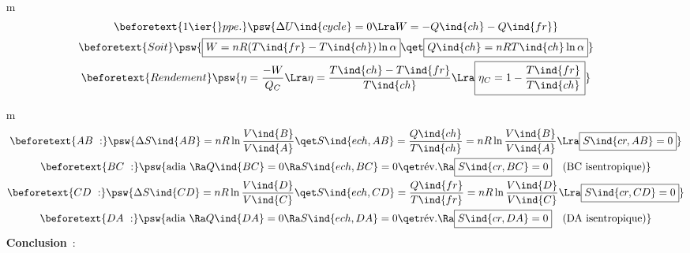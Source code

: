 \documentclass[../../main/main.tex]{subfiles}
\begin{document}
\begin{tcb*}[breakable]
\begin{enumerate}[label=\sqenumi]
\begin{gather*}
      \end{gather*}
    \item[m]
      \begin{gather*}
        \beforetext{1\ier{} ppe.}
        \psw{%
                  \Delta{U}\ind{cycle} = 0
                \Lra
                W = -Q\ind{ch} - Q\ind{fr}
        }%
        \\\beforetext{Soit}
        \psw{%
                  \boxed{W = nR(T\ind{fr} - T\ind{ch})\ln \alpha}
                \qet
                \boxed{Q\ind{ch} = nRT\ind{ch}\ln \alpha}
        }%
        \\\beforetext{Rendement}
        \psw{%
                  \eta = \frac{-W}{Q_C}
                \Lra
                \eta = \frac{T\ind{ch}-T\ind{fr}}{T\ind{ch}}
                \Lra
                \boxed{\eta_C = 1-\frac{T\ind{fr}}{T\ind{ch}}}
        }%
      \end{gather*}
    \item[m]
      \begin{gather*}
        \beforetext{AB~:}
        \psw{%
                  \Delta{S}\ind{AB} = nR \ln \frac{V\ind{B}}{V\ind{A}}
                \qet
                S\ind{ech,AB} = \frac{Q\ind{ch}}{T\ind{ch}} = nR \ln
                \frac{V\ind{B}}{V\ind{A}}
                \Lra
                \boxed{S\ind{cr,AB} = 0}
        }%
        \\\beforetext{BC~:}
        \psw{%
                  \text{adia~} \Ra Q\ind{BC} = 0
                \Ra 
                S\ind{ech,BC} = 0
                \qet
                \text{rév.} \Ra \boxed{S\ind{cr,BC} = 0}
                \quad \text{(BC isentropique)}
        }%
        \\\beforetext{CD~:}
        \psw{%
                  \Delta{S}\ind{CD} = nR \ln \frac{V\ind{D}}{V\ind{C}}
                \qet
                S\ind{ech,CD} = \frac{Q\ind{fr}}{T\ind{fr}} = nR \ln
                \frac{V\ind{D}}{V\ind{C}}
                \Lra
                \boxed{S\ind{cr,CD} = 0}
        }%
        \\\beforetext{DA~:}
        \psw{%
                  \text{adia~} \Ra Q\ind{DA} = 0
                \Ra 
                S\ind{ech,DA} = 0
                \qet
                \text{rév.} \Ra \boxed{S\ind{cr,DA} = 0}
                \quad \text{(DA isentropique)}
        }%
      \end{gather*}
    \textbf{Conclusion}~: 
  \end{enumerate}
\end{tcb*}
\end{document}
